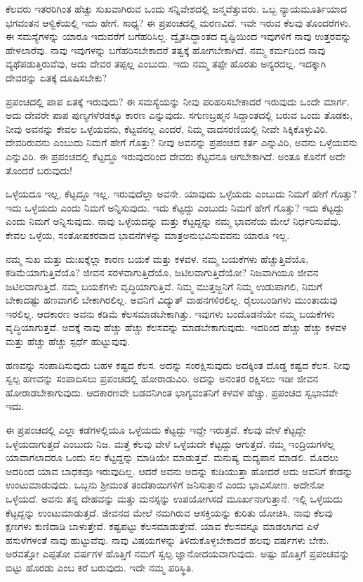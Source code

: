ಕೆಲವರು ಇತರರಿಗಿಂತ ಹೆಚ್ಚು ಸುಖವಾಗಿರುವ ಒಂದು ಸನ್ನಿವೇಶದಲ್ಲಿ ಜನ್ಮವೆತ್ತುವರು. ಒಬ್ಬ ನ್ಯಾಯಮೂರ್ತಿಯಾದ ಭಗವಂತನ ಆಳ್ವಿಕೆಯಲ್ಲಿ ಇದು ಹೇಗೆ. ಸಾಧ್ಯ? ಈ ಪ್ರಪಂಚದಲ್ಲಿ ಮರಣವಿದೆ. ಇವೇ ಇರುವ ಕೆಲವು ತೊಂದರೆಗಳು. ಈ ಸಮಸ್ಯೆಗಳನ್ನು ಯಾರೂ ಇದುವರೆಗೆ ಬಗೆಹರಿಸಿಲ್ಲ. ದ್ವೈತಸಿದ್ಧಾಂತದ ದೃಷ್ಟಿಯಿಂದ ಇವುಗಳಿಗೆ ನಾವು ಉತ್ತರವನ್ನು ಹೇಳಲಾರೆವು. ನಾವು ಇವುಗಳನ್ನು ಬಗೆಹರಿಸಬೇಕಾದರೆ ತತ್ವಕ್ಕೆ ಹೋಗಬೇಕಾಗಿದೆ. ನಮ್ಮ ಕರ್ಮದಿಂದ ನಾವು ವ್ಯಥೆಪಡುತ್ತಿರುವೆವು, ಅದು ದೇವರ ತಪ್ಪಲ್ಲ ಎಂಬುದು. ಇದು ನಮ್ಮ ತಪ್ಪೇ ಹೊರತು ಅನ್ಯರದಲ್ಲ. ಇದಕ್ಕಾಗಿ ದೇವರನ್ನು ಏತಕ್ಕೆ ದೂಷಿಸಬೇಕು?

ಪ್ರಪಂಚದಲ್ಲಿ ಪಾಪ ಏತಕ್ಕೆ ಇರುವುದು? ಈ ಸಮಸ್ಯೆಯನ್ನು ನೀವು ಪರಿಹರಿಸಬೇಕಾದರೆ ಇರುವುದು ಒಂದೇ ಮಾರ್ಗ. ಅದು ದೇವರೇ ಪಾಪ ಪುಣ್ಯಗಳೆರಡಕ್ಕೂ ಕಾರಣ ಎನ್ನುವುದು. ಸಗುಣಬ್ರಹ್ಮನ ಸಿದ್ದಾಂತದಲ್ಲಿ ಬರುವ ಒಂದು ತೊಡಕು, ನೀವು ಅವನನ್ನು ಕೇವಲ ಒಳ್ಳೆಯವನು, ಕೆಟ್ಟವನಲ್ಲ ಎಂದರೆ, ನಿಮ್ಮ ವಾದಸರಣಿಯಲ್ಲಿ ನೀವೇ ಸಿಕ್ಕಿಕೊಳ್ಳುವಿರಿ. ದೇವರಿರುವನು ಎಂಬುದು ನಿಮಗೆ ಹೇಗೆ ಗೊತ್ತು? ನೀವು ಅವನನ್ನು ಪ್ರಪಂಚದ ಕರ್ತ ಎನ್ನುವಿರಿ, ಅವನು ಒಳ್ಳೆಯವನು ಎನ್ನುವಿರಿ. ಈ ಪ್ರಪಂಚದಲ್ಲಿ ಕೆಟ್ಟದ್ದೂ ಇರುವುದರಿಂದ ದೇವರು ಕೆಟ್ಟವನೂ ಆಗಬೇಕಾಗಿದೆ. ಅಂತೂ ಕೊನೆಗೆ ಅದೇ ತೊಂದರೆ ಬರುವುದು!

ಒಳ್ಳೆಯದೂ ಇಲ್ಲ, ಕೆಟ್ಟದ್ದೂ ಇಲ್ಲ. ಇರುವುದೆಲ್ಲಾ ಅವನೇ. ಯಾವುದು ಒಳ್ಳೆಯದು ಎಂಬುದು ನಿಮಗೆ ಹೇಗೆ ಗೊತ್ತು? ಇದು ಒಳ್ಳೆಯದು ಎಂದು ನಿಮಗೆ ಅನ್ನಿಸುವುದು. ಇದು ಕೆಟ್ಟದ್ದು ಎಂಬುದು ನಿಮಗೆ ಹೇಗೆ ಗೊತ್ತು? ಇದು ಕೆಟ್ಟದ್ದು ಎಂದು ನಿಮಗೆ ಅನ್ನಿಸುವುದು. ನಾವು ಒಳ್ಳೆಯದನ್ನು ಮತ್ತು ಕೆಟ್ಟದ್ದನ್ನು ನಮ್ಮ ಭಾವನೆಯ ಮೇಲೆ ನಿರ್ಧರಿಸುವೆವು. ಕೇವಲ ಒಳ್ಳೆಯ, ಸಂತೋಷಕರವಾದ ಭಾವನೆಗಳನ್ನು ಮಾತ್ರ\break ಅನುಭವಿಸುವವನು ಯಾರೂ ಇಲ್ಲ.

ನಮ್ಮ ಸುಖ ಮತ್ತು ದುಃಖಕ್ಕೆಲ್ಲಾ ಕಾರಣ ಬಯಕೆ ಮತ್ತು ಕಳವಳ. ನಮ್ಮ ಬಯಕೆಗಳು ಹೆಚ್ಚುತ್ತಿವೆಯೊ, ಕಡಿಮೆಯಾಗುತ್ತಿವೆಯೊ? ಜೀವನ ಸರಳವಾಗುತ್ತಿದೆಯೊ, ಜಟಿಲವಾಗುತ್ತಿದೆಯೋ? ನಿಜವಾಗಿಯೂ ಜೀವನ ಜಟಿಲವಾಗುತ್ತಿದೆ. ನಮ್ಮ ಬಯಕೆಗಳು ವೃದ್ಧಿಯಾಗುತ್ತಿವೆ. ನಿಮ್ಮ ಮುತ್ತಜ್ಜನಿಗೆ ನಿಮ್ಮ ಉಡುಪಾಗಲಿ, ನಿಮಗೆ ಬೇಕಾದಷ್ಟು ಹಣವಾಗಲಿ ಬೇಕಾಗಿರಲಿಲ್ಲ. ಅವನಿಗೆ ವಿದ್ಯುತ್ ವಾಹನಗಳಿರಲಿಲ್ಲ. ರೈಲುಬಂಡಿಗಳು ಮುಂತಾದುವು ಇರಲಿಲ್ಲ. ಆದಕಾರಣ ಅವನು ಕಡಿಮೆ ಕೆಲಸಮಾಡಬೇಕಾಗಿತ್ತು. ಇವುಗಳು ಬಂದೊಡನೆಯೇ ನಮ್ಮ ಬಯಕೆಗಳು ವೃದ್ಧಿಯಾಗುತ್ತವೆ. ಅದಕ್ಕೆ ನಾವು ಹೆಚ್ಚು ಹೆಚ್ಚು ಕೆಲಸವನ್ನು ಮಾಡಬೇಕಾಗುವುದು. ಇದರಿಂದ ಹೆಚ್ಚು ಹೆಚ್ಚು ಕಳವಳ ಮತ್ತು ಹೆಚ್ಚು ಹೆಚ್ಚು ಸ್ಪರ್ಧೆ ಹುಟ್ಟುವುವು.

ಹಣವನ್ನು ಸಂಪಾದಿಸುವುದು ಬಹಳ ಕಷ್ಟದ ಕೆಲಸ. ಅದನ್ನು ಸಂರಕ್ಷಿಸುವುದು ಅದಕ್ಕಿಂತ ದೊಡ್ಡ ಕಷ್ಟದ ಕೆಲಸ. ನೀವು ಸ್ವಲ್ಪ ಹಣವನ್ನು ಸಂಪಾದಿಸಲು ಪ್ರಪಂಚದಲ್ಲಿ ಹೋರಾಡುವಿರಿ. ಅದನ್ನು ಅನಂತರ ರಕ್ಷಿಸಲು ಇಡೀ ಜೀವನ ಹೋರಾಡಬೇಕಾಗುವುದು. ಆದಕಾರಣವೇ ಬಡವನಿಗಿಂತ ಭಾಗ್ಯವಂತನಿಗೆ ಕಳವಳ ಹೆಚ್ಚು. ಪ್ರಪಂಚದ ಸ್ವಭಾವವೇ ಇದು.

ಈ ಪ್ರಪಂಚದಲ್ಲಿ ಎಲ್ಲಾ ಕಡೆಗಳಲ್ಲಿಯೂ ಒಳ್ಳೆಯದು ಕೆಟ್ಟದ್ದು ಇದ್ದೇ ಇರುತ್ತವೆ. ಕೆಲವು ವೇಳೆ ಕೆಟ್ಟದ್ದೇ ಒಳ್ಳೆಯದಾಗುತ್ತದೆ ಎಂಬುದು ನಿಜ. ಮತ್ತೆ ಕೆಲವು ವೇಳೆ ಒಳ್ಳೆಯದೇ ಕೆಟ್ಟದ್ದು ಆಗುತ್ತದೆ. ನಮ್ಮ ಇಂದ್ರಿಯಗಳೆಲ್ಲ ಯಾವಾಗಲಾದರೂ ಒಂದು ಸಲ ಕೆಟ್ಟದ್ದನ್ನು ಮಾಡಿಯೇ ಮಾಡುತ್ತವೆ. ಮನುಷ್ಯ ಮದ್ಯಪಾನ ಮಾಡಲಿ. ಮೊದಲು ಅದರಿಂದ ಯಾವ ಬಾಧಕವೂ ಇರುವುದಿಲ್ಲ. ಆದರೆ ಅವನು ಅದನ್ನು ಕುಡಿಯುತ್ತಾ ಹೋದರೆ ಅದು ಅವನಿಗೆ ಕೇಡನ್ನು ಉಂಟುಮಾಡುವುದು. ಒಬ್ಬನು ಶ‍್ರೀಮಂತ ತಂದೆತಾಯಿಗಳಿಗೆ ಜನಿಸುತ್ತಾನೆ ಎಂದು ಭಾವಿಸೋಣ. ಅದೇನೋ ಒಳ್ಳೆಯದೆ. ಅವನು ತನ್ನ ದೇಹವನ್ನು ಮತ್ತು ಮನಸ್ಸನ್ನು ಉಪಯೋಗಿಸದೆ ಮೂರ್ಖನಾಗುತ್ತಾನೆ. ಇಲ್ಲಿ ಒಳ್ಳೆಯದು ಕೆಟ್ಟದ್ದನ್ನು ಉಂಟುಮಾಡುತ್ತದೆ. ಜೀವನದ ಮೇಲೆ ನಮಗಿರುವ ಆಸಕ್ತಿಯನ್ನು ಕುರಿತು ಯೋಚಿಸಿ, ನಾವು ಕೆಲವು ಕ್ಷಣಗಳು ಕುಣಿದಾಡಿ ಬಾಳುತ್ತೇವೆ. ಕಷ್ಟಪಟ್ಟು ಕೆಲಸಮಾಡುತ್ತೇವೆ. ಯಾವ ಕೆಲಸವನ್ನೂ ಮಾಡಲಾಗದ ಎಳೆ ಹಸುಳೆಗಳಂತೆ ನಾವು ಹುಟ್ಟುವೆವು. ನಾವು ವಿಷಯಗಳನ್ನು ತಿಳಿದುಕೊಳ್ಳಬೇಕಾದರೆ ಹಲವು ವರ್ಷಗಳು ಬೇಕು. ಅರವತ್ತೋ ಎಪ್ಪತೋ ವರ್ಷಗಳ ಹೊತ್ತಿಗೆ ನಮಗೆ ಸ್ವಲ್ಪ ಜ್ಞಾನೋದಯವಾಗುವುದು. ಅಷ್ಟು ಹೊತ್ತಿಗೆ ಪ್ರಪಂಚವನ್ನು ಬಿಟ್ಟು ಹೊರಡು ಎಂಬ ಕರೆ ಬರುವುದು. ಇದೇ ನಮ್ಮ ಪರಿಸ್ಥಿತಿ.

